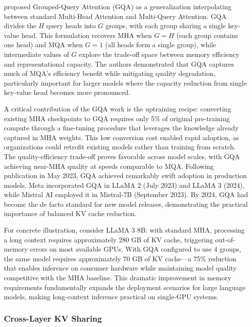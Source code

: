 \citet{ainslie2023gqa} proposed Grouped-Query Attention (GQA) as a generalization interpolating between standard Multi-Head Attention and Multi-Query Attention. GQA divides the $H$ query heads into $G$ groups, with each group sharing a single key-value head. This formulation recovers MHA when $G = H$ (each group contains one head) and MQA when $G = 1$ (all heads form a single group), while intermediate values of $G$ explore the trade-off space between memory efficiency and representational capacity. The authors demonstrated that GQA captures much of MQA's efficiency benefit while mitigating quality degradation, particularly important for larger models where the capacity reduction from single key-value head becomes more pronounced.

A critical contribution of the GQA work is the uptraining recipe: converting existing MHA checkpoints to GQA requires only 5\% of original pre-training compute through a fine-tuning procedure that leverages the knowledge already captured in MHA weights. This low conversion cost enabled rapid adoption, as organizations could retrofit existing models rather than training from scratch. The quality-efficiency trade-off proves favorable across model scales, with GQA achieving near-MHA quality at speeds comparable to MQA. Following publication in May 2023, GQA achieved remarkably swift adoption in production models. Meta incorporated GQA in LLaMA 2 (July 2023) and LLaMA 3 (2024), while Mistral AI employed it in Mistral-7B (September 2023). By 2024, GQA had become the de facto standard for new model releases, demonstrating the practical importance of balanced KV cache reduction.

For concrete illustration, consider LLaMA 3 8B: with standard MHA, processing a long context requires approximately 280 GB of KV cache, triggering out-of-memory errors on most available GPUs. With GQA configured to use 4 groups, the same model requires approximately 70 GB of KV cache---a 75\% reduction that enables inference on consumer hardware while maintaining model quality competitive with the MHA baseline. This dramatic improvement in memory requirements fundamentally expands the deployment scenarios for large language models, making long-context inference practical on single-GPU systems.

\subsubsection{Cross-Layer KV Sharing}

